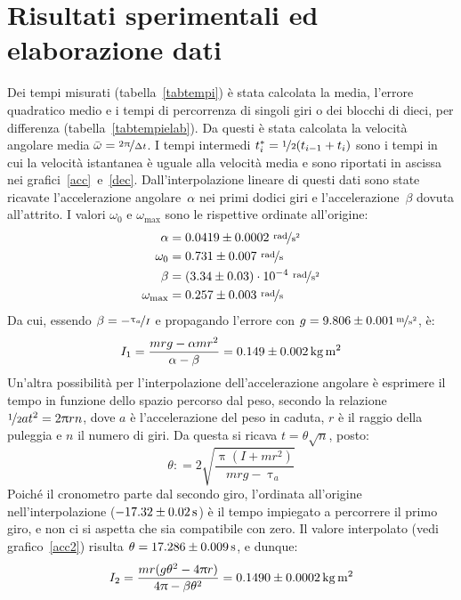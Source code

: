 \documentclass[italian,a4paper]{article}
\renewcommand{\pi}{\uppi} %
\renewcommand{\tau}{\uptau} %
\newcommand{\coloneqq}{\mathrel{\mathop:}=} %
\begin{document}
\section{Risultati sperimentali ed elaborazione dati}
Dei tempi misurati (tabella~\ref{tabtempi}) è stata calcolata la media, l'errore quadratico medio e i tempi di percorrenza di singoli giri o dei blocchi di dieci, per differenza (tabella~\ref{tabtempielab}). Da questi è stata calcolata la velocità angolare media $\bar{\omega} = \nicefrac{2\pi}{\Delta t}$. I tempi intermedi $t^{\ast}_i=\nicefrac{1}{2}(t_{i-1}+t_{i})$ sono i tempi in cui la velocità istantanea è uguale alla velocità media e sono riportati in ascissa nei grafici~{\ref{acc}}~e~{\ref{dec}}. Dall'interpolazione lineare di questi dati sono state ricavate l'accelerazione angolare~$\alpha$  nei primi dodici giri e l'accelerazione~$\beta$ dovuta all'attrito. I valori $\omega_0$ e $\omega_{\mathrm{max}}$ sono le rispettive ordinate all'origine:
\begin{align*}
		\alpha &=  0.0419 \pm 0.0002\ \unitfrac{rad}{s^2}\\
		\omega_0 &= 0.731 \pm 0.007\  \unitfrac{rad}{s}\\
		\beta &= (3.34 \pm 0.03)\cdot10^{-4}\  \unitfrac{rad}{s^2}\\
		\omega_{\mathrm{max}} &= 0.257 \pm 0.003\  \unitfrac{rad}{s}
\end{align*}
Da cui, essendo $\beta=-\nicefrac{\tau_a}{I}$ e propagando l'errore con $g=\unitfrac[9.806\pm0.001]{m}{s^2}$, è:
\begin{equation*}
	I_1=\dfrac{mrg-\alpha mr^2}{\alpha-\beta} = \unit[0.149 \pm 0.002]{kg \, m^2}
\end{equation*}
Un'altra possibilità per l'interpolazione dell'accelerazione angolare è esprimere il tempo in funzione dello spazio percorso dal peso, secondo la relazione $\nicefrac{1}{2}at^2 = 2\pi r n$, dove $a$ è l'accelerazione del peso in caduta, $r$ è il raggio della puleggia e $n$ il numero di giri. Da questa si ricava $t=\theta \sqrt{n}$, posto:
\begin{equation*}
	\theta \coloneqq 2\sqrt{\dfrac{\pi(I+mr^2)}{mrg-\tau_a}}
\end{equation*}
Poiché il cronometro parte dal secondo giro, l'ordinata all'origine nell'interpolazione ($\unit[-17.32\pm0.02]{s}$) è il tempo impiegato a percorrere il primo giro, e non ci si aspetta che sia compatibile con zero. Il valore interpolato (vedi grafico~{\ref{acc2}}) risulta $\theta = \unit[17.286 \pm 0.009]{s}$, e dunque:
\begin{equation*}
	I_2 = \dfrac{mr(g\theta^2-4\pi r)}{4\pi - \beta \theta^2} =  \unit[0.1490 \pm 0.0002]{kg \, m^2}
\end{equation*}
\end{document}
